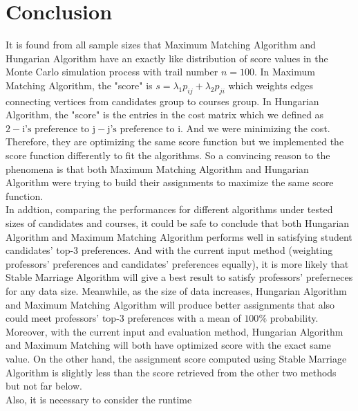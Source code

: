 \documentclass[twoside,twocolumn]{article}
\begin{document}
    \section{Conclusion}
    It is found from all sample sizes that Maximum Matching Algorithm and Hungarian Algorithm have an exactly like
    distribution of score values in the Monte Carlo simulation process with trail number $n=100$. In Maximum Matching 
    Algorithm, the "score" is $s = \lambda_1 p_{ij} + \lambda_2 p_{ji}$ which weights 
    edges connecting vertices from candidates group to courses group. In Hungarian Algorithm, the "score" is the entries
    in the cost matrix which we defined as $2 - \text{i's preference to j} - \text{j's preference to i}$. And we were 
    minimizing the cost. Therefore, they are optimizing the same score function but we implemented the score function 
    differently to fit the algorithms. So a convincing reason to the phenomena is that both Maximum Matching Algorithm and 
    Hungarian Algorithm were trying to build their assignments to maximize the same score function. 
    \\\indent In addtion, comparing the performances for different algorithms under tested sizes of candidates and courses, it could be
    safe to conclude that both Hungarian Algorithm and Maximum Matching Algorithm performs well in satisfying student candidates'
    top-3 preferences. And with the current input method (weighting professors' preferences and candidates' preferences equally), it is
    more likely that Stable Marriage Algorithm will give a best result to satisfy professors' preferneces for any data size. Meanwhile, 
    as the size of data increases, Hungarian Algorithm and Maximum Matching Algorithm will produce better assignments that also could 
    meet professors' top-3 preferences with a mean of $100\%$ probability.
    \\\indent Moreover, with the current input and evaluation method, Hungarian Algorithm and Maximum Matching will both have optimized score
    with the exact same value. On the other hand, the assignment score computed using Stable Marriage Algorithm is slightly less than the score
    retrieved from the other two methods but not far below.
    \\\indent Also, it is necessary to consider the runtime 
\end{document}
